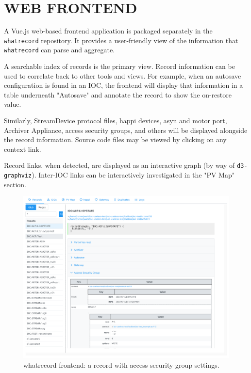 \documentclass[letter,
               keeplastbox,   %
               ]{jacow}
\begin{document}
\section{WEB FRONTEND}

A Vue.js\cite{vuejs} web-based frontend application is packaged separately in
the \verb_whatrecord_ repository.  It provides a user-friendly view of the information
that \verb_whatrecord_ can parse and aggregate.

A searchable index of records is the primary view.  Record information can be
used to correlate back to other tools and views. For example, when an autosave
configuration is found in an IOC, the frontend will display that information in
a table underneath "Autosave" and annotate the record to show the on-restore
value.

Similarly, StreamDevice protocol files, happi devices, asyn and motor port,
Archiver Appliance, access security groups, and others will be displayed
alongside the record information.  Source code files may be viewed by
clicking on any context link.

Record links, when detected, are displayed as an interactive graph (by way of
\verb_d3-graphviz_\cite{d3graphviz}).  Inter-IOC links can be interactively
investigated in the "PV Map" section.

\begin{figure}
   \centering
   \includegraphics*[width=.9\columnwidth]{whatrecord-asg}
   \caption{whatrecord frontend: a record with access security group settings.}
   \label{fig:whatrecord-asg}
\end{figure}
\end{document}
